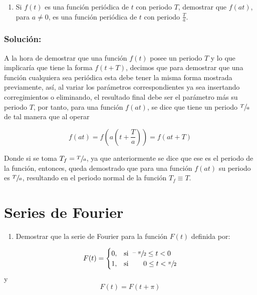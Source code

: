 \begin{multicols}{2}
\begin{enumerate}[leftmargin=15pt, resume]
    \item Si $f(t)$ es una función  periódica de $t$ con periodo $T$, demostrar que $f(at)$, para $a \neq 0 $, es una función periódica de $t$ con periodo $\frac{T}{a}$.
\end{enumerate}

\subsubsection*{\textbf{Solución:}}

A la hora de demostrar que una función $f(t)$ posee un periodo $T$ y lo que implicaría que tiene la forma $f(t+T)$, decimos que para demostrar que una función cualquiera sea periódica esta debe tener la misma forma mostrada previamente, así, al variar los parámetros correspondientes ya sea insertando corregimientos o eliminando, el resultado final debe ser el parámetro más su periodo $T$, por tanto, para una función $f(at)$, se dice que tiene un periodo $\sfrac{T}{a}$ de tal manera que al operar

\begin{equation*}
    f(at) = f\left(a\left(t + \frac{T}{a}\right)\right) = f\left(at + T\right)
\end{equation*}

Donde si se toma $T_f = \sfrac{T}{a}$, ya que anteriormente se dice que ese es el periodo de la función, entonces, queda demostrado que para una función $f(at)$ su periodo es $\sfrac{T}{a}$, resultando en el periodo normal de la función $T_f \equiv T$.

\section{Series de Fourier}

\begin{enumerate}[leftmargin=15pt]
    \item Demostrar que la serie de Fourier para la función $F(t)$ definida por:
\end{enumerate}

\begin{equation}
    F(t) =
    \begin{cases}
    0,&\text{si } \sfrac{-\pi}{2} \leq t < 0\\
    1,&\text{si } \hspace{18pt} 0 \leq t < \sfrac{\pi}{2}
    \end{cases}
\label{enu:1}
\end{equation}
\hspace{12pt} y
\begin{equation*}
    F(t) = F\left(t + \pi\right)
\end{equation*}


\end{multicols}

